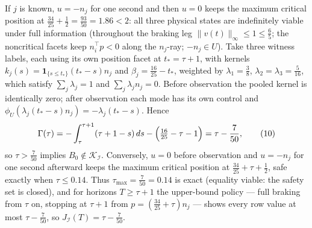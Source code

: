 \documentclass[10pt,twocolumn]{article}
\theoremstyle{plain}
\theoremstyle{definition}
\theoremstyle{remark}
\begin{document}
If \(j\) is known, \(u = -n_j\) for one second and then \(u = 0\) keeps the
maximum critical position at \(\tfrac{34}{25} + \tfrac12 =
\tfrac{93}{50} = 1.86 < 2\): all three physical states are indefinitely
viable under full information (throughout the braking leg
\(\|v(t)\|_\infty \le 1 \le \tfrac65\); the noncritical facets keep
\(n_i^\top p < 0\) along the \(n_j\)-ray; \(-n_j \in U\)). Take three witness labels, each using its own position facet at
\(t_* = \tau + 1\), with kernels
\(k_j(s) = \mathbf{1}_{\{s \le t_*\}} (t_* - s) n_j\) and
\(\beta_j = \tfrac{16}{25} - t_*\), weighted by \(\lambda_1 = \tfrac38\),
\(\lambda_2 = \lambda_3 = \tfrac{5}{16}\), which satisfy \(\sum_j \lambda_j = 1\) and \(\sum_j \lambda_j n_j =
0\). Before observation the pooled kernel is
identically zero; after observation each mode has its own control and
\(\phi_U(\lambda_j (t_* - s) n_j) = -\lambda_j (t_* - s)\). Hence
\[
\Gamma(\tau) = -\int_\tau^{\tau+1} (\tau + 1 - s)\, ds
- \Bigl(\tfrac{16}{25} - \tau - 1\Bigr) = \tau - \frac{7}{50},
\tag{10}
\]
so \(\tau > \tfrac{7}{50}\) implies
\(B_0 \notin \mathcal{K}_{\mathcal{I}}\). Conversely, \(u = 0\) before
observation and \(u = -n_j\) for one second afterward keeps the maximum
critical position at \(\tfrac{34}{25} + \tau + \tfrac12\), safe exactly when
\(\tau \le 0.14\). Thus \(\tau_{\max} = \tfrac{7}{50} = 0.14\) is exact (equality viable:
the safety set is closed), and for horizons \(T \ge \tau + 1\) the
upper-bound policy --- full braking from \(\tau\) on, stopping at
\(\tau + 1\) from \(p = (\tfrac{34}{25} + \tau)n_j\) --- shows every row
value at most \(\tau - \tfrac{7}{50}\), so
\(J_{\mathcal{I}}(T) = \tau - \tfrac{7}{50}\).
\end{document}
